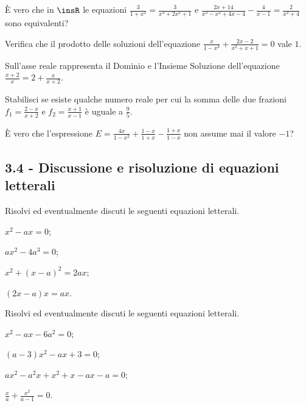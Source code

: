 \begin{esercizio}
 \label{ese:3.53}
È vero che in $\insR$ le equazioni $\frac{3}{1 + x^{2}} = \frac{3}{x^{4} + 2 x^{2} + 1}$ e $\frac{2 x + 14}{x^{3}-x^{2} + 4 x-4}-\frac{4}{x-1} =\frac{2}{x^{2} + 4}$ sono equivalenti?
\end{esercizio}

\begin{esercizio}
 \label{ese:3.54}
Verifica che il prodotto delle soluzioni dell'equazione $\frac{x}{1-x^{3}} + \frac{2 x-2}{x^{2} + x + 1}=0$ vale $1$.
\end{esercizio}

\begin{esercizio}
 \label{ese:3.55}
Sull'asse reale rappresenta il Dominio e l'Insieme Soluzione dell'equazione $\frac{x + 2}{x}=2+\frac{x}{x + 2}$.
\end{esercizio}

\begin{esercizio}[\Ast]
 \label{ese:3.56}
Stabilisci se esiste qualche numero reale per cui la somma delle due frazioni $f_{1}=\frac{2-x}{x + 2}$ e $f_{2}=\frac{x + 1}{x-1}$ è uguale a $\frac{9}{5}$.
\end{esercizio}

\begin{esercizio}
 \label{ese:3.57}
È vero che l'espressione $E=\frac{4 x}{1-x^{2}} + \frac{1-x}{1 + x}-\frac{1 + x}{1-x}$ non assume mai il valore $-1$?
\end{esercizio}

\subsection*{3.4 - Discussione e risoluzione di equazioni letterali}

\begin{esercizio}[\Ast]
 \label{ese:3.58}
Risolvi ed eventualmente discuti le seguenti equazioni letterali.
\begin{multicols}{2}
\begin{enumeratea}
\item $x^{2}-a x = 0$;
\item $ax^{2}-4a^{3} = 0$;
\item $x^{2} + (x-a)^{2} = 2 a x$;
\item $(2 x-a) x = a x$.
\end{enumeratea}
\end{multicols}
\end{esercizio}
\pagebreak
\begin{esercizio}[\Ast]
 \label{ese:3.59}
Risolvi ed eventualmente discuti le seguenti equazioni letterali.
\begin{multicols}{2}
\begin{enumeratea}
\item $x^{2}-a x-6 a^{2} = 0$;
\item $(a-3) x^{2}-a x + 3 = 0$;
\item $a x^{2}-a^{2} x + x^{2} + x-a x-a = 0$;
\item $\frac{x}{a} + \frac{x^{2}}{a-1} = 0$.
\end{enumeratea}
\end{multicols}
\end{esercizio}


